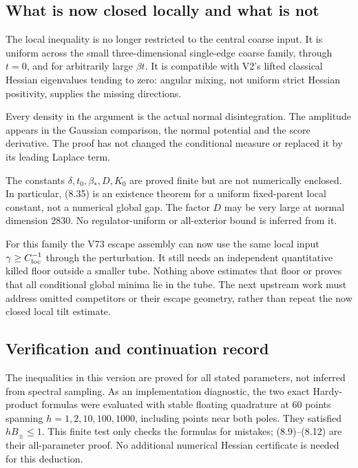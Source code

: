 \documentclass[11pt,oneside]{article}
\begin{document}
\subsection{What is now closed locally and what is not}

The local inequality is no
longer restricted to the
central coarse input.
It is uniform across
the small three-dimensional
single-edge coarse family,
through \(t=0\), and for
arbitrarily large \(\beta t\).
It is compatible with
V2's lifted classical
Hessian eigenvalues tending
to zero: angular mixing,
not uniform strict Hessian
positivity, supplies the
missing directions.

Every density in the
argument is the actual
normal disintegration.
The amplitude appears in
the Gaussian comparison,
the normal potential and
the score derivative.
The proof has not changed
the conditional measure
or replaced it by its
leading Laplace term.

The constants
\(\delta,t_0,\beta_*,D,K_0\)
are proved finite but
are not numerically enclosed.
In particular, (8.35)
is an existence theorem
for a uniform fixed-parent
local constant, not a
numerical global gap.
The factor \(D\) may be
very large at normal
dimension 2830.
No regulator-uniform
or all-exterior bound
is inferred from it.

For this family the V73
escape assembly can now
use the same local input
\(\gamma\ge C_{\rm loc}^{-1}\)
through the perturbation.
It still needs an
independent quantitative
killed floor outside a
smaller tube. Nothing
above estimates that
floor or proves that
all conditional global
minima lie in the tube.
The next upstream work
must address omitted
competitors or their
escape geometry, rather
than repeat the now
closed local tilt estimate.

\subsection{Verification and continuation record}

The inequalities in this
version are proved for
all stated parameters,
not inferred from spectral
sampling. As an implementation
diagnostic, the two exact
Hardy-product formulas
were evaluated with stable
floating quadrature at
60 points spanning
\(h=1,2,10,100,1000\),
including points near
both poles. They satisfied
\(hB_\pm\le1\). This
finite test only checks
the formulas for mistakes;
(8.9)--(8.12) are their
all-parameter proof.
No additional numerical
Hessian certificate is
needed for this deduction.
\end{document}
